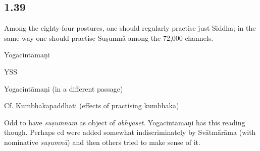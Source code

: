 \begin{ekdosis}
\subsection*{1.39}
\begin{translation}[hp01_039]
Among the eighty-four postures, one should regularly practise just Siddha; in the same way one should practise Suṣumnā among the 72,000 channels.
\end{translation}

\begin{sources}[hp01_039]
\end{sources}

\begin{testimonia}[hp01_039]
Yogacintāmaṇi

\begin{versinnote}
\end{versinnote}

YSS

\begin{versinnote}
\end{versinnote}

Yogacintāmaṇi (in a different passage)
​​
\begin{versinnote}
\end{versinnote}

Cf. Kumbhakapaddhati (effects of practising kumbhaka)

\begin{versinnote}
\end{versinnote}

\end{testimonia}

\begin{philcomm}[hp01_039]
Odd to have \emph{suṣumnām} as object of \emph{abhyaset}. Yogacintāmaṇi has this reading though. Perhaps cd were added somewhat indiscriminately by Svātmārāma (with nominative \emph{suṣumnā}) and then others tried to make sense of it.


\end{philcomm}
\end{ekdosis}
